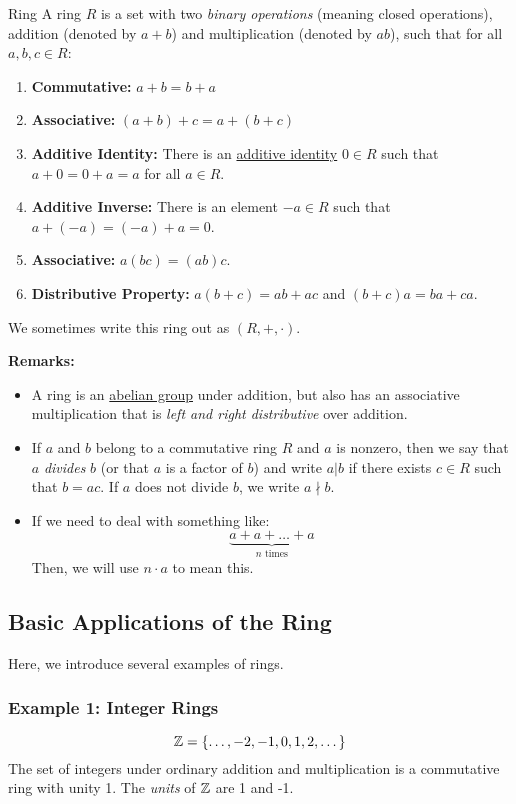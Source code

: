 \documentclass[letterpaper]{article}
\begin{document}
\begin{definition}{Ring}{}
    A ring $R$ is a set with two \emph{binary operations} (meaning closed operations), addition (denoted by $a + b$) and multiplication (denoted by $ab$), such that for all $a, b, c \in R$:
    \begin{enumerate}
        \item \textbf{Commutative:} $a + b = b + a$
        \item \textbf{Associative:} $(a + b) + c = a + (b + c)$
        \item \textbf{Additive Identity:} There is an \underline{additive identity} $0 \in R$ such that $a + 0 = 0 + a = a$ for all $a \in R$.
        \item \textbf{Additive Inverse:} There is an element $-a \in R$ such that $a + (-a) = (-a) + a = 0$. 
        \item \textbf{Associative:} $a(bc) = (ab)c$. 
        \item \textbf{Distributive Property:} $a(b + c) = ab + ac$ and $(b + c)a = ba + ca$.  
    \end{enumerate}
    We sometimes write this ring out as $(R, +, \cdot)$. 
\end{definition}
\textbf{Remarks:}
\begin{itemize}
    \item A ring is an \underline{abelian group} under addition, but also has an associative multiplication that is \emph{left and right distributive} over addition.
    \item If $a$ and $b$ belong to a commutative ring $R$ and $a$ is nonzero, then we say that $a$ \emph{divides} $b$ (or that $a$ is a factor of $b$) and write $a | b$ if there exists $c \in R$ such that $b = ac$. If $a$ does not divide $b$, we write $a \nmid b$.
    \item If we need to deal with something like:
    \[\underbrace{a + a + \dots + a}_{n \text{ times}}\]
    Then, we will use $n \cdot a$ to mean this. 
\end{itemize}

\subsection{Basic Applications of the Ring}
Here, we introduce several examples of rings. 

\subsubsection{Example 1: Integer Rings}
\[\mathbb{Z} = \{\dots, -2, -1, 0, 1, 2, \dots\}\]
The set of integers under ordinary addition and multiplication is a commutative ring with unity 1. The \emph{units} of $\mathbb{Z}$ are 1 and -1.
\end{document}
